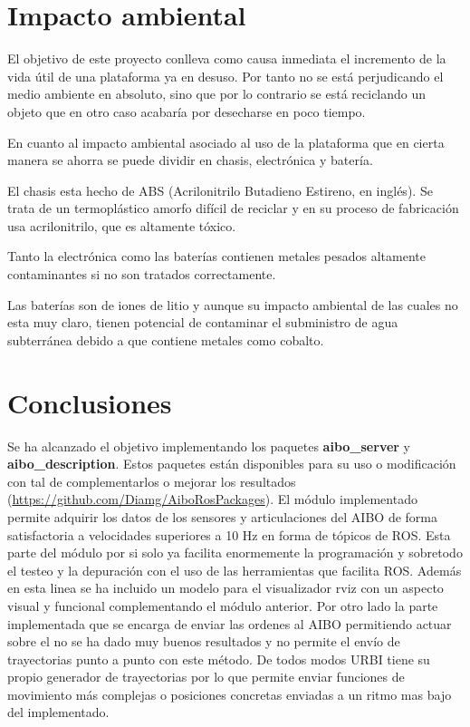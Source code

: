 \documentclass[12pt,a4paper,final,twoside]{book}
\begin{document}
\newpage

\chapter{Impacto ambiental}
\thispagestyle{fancy}
El objetivo de este proyecto conlleva como causa inmediata el incremento de la vida útil de una plataforma ya en desuso. Por tanto no se está perjudicando el medio ambiente en absoluto, sino que por lo contrario se está reciclando un objeto que en otro caso acabaría por desecharse en poco tiempo.

En cuanto al impacto ambiental asociado al uso de la plataforma que en cierta manera se ahorra se puede dividir en chasis, electrónica y batería.

El chasis esta hecho de ABS (Acrilonitrilo Butadieno Estireno, en inglés). Se trata de un termoplástico amorfo difícil de reciclar y en su proceso de fabricación usa acrilonitrilo, que es altamente tóxico.

Tanto la electrónica como las baterías contienen metales pesados altamente contaminantes si no son tratados correctamente.

Las baterías son de iones de litio y aunque su impacto ambiental de las cuales no esta muy claro, tienen potencial de contaminar el subministro de agua subterránea debido a que contiene metales como cobalto.


\newpage
\chapter*{Conclusiones}
\thispagestyle{fancy}
Se ha alcanzado el objetivo implementando los paquetes \textbf{aibo{\_}server} y \textbf{aibo{\_}description}. Estos paquetes están disponibles para su uso o modificación con tal de complementarlos o mejorar los resultados (\url{https://github.com/Diamg/AiboRosPackages}). 
El módulo implementado permite adquirir los datos de los sensores y articulaciones del AIBO de forma satisfactoria a velocidades superiores a 10 Hz en forma de tópicos de ROS. Esta parte del módulo por si solo ya facilita enormemente la programación y sobretodo el testeo y la depuración con el uso de las herramientas que facilita ROS. Además en esta linea se ha incluido un modelo para el visualizador rviz con un aspecto visual y funcional complementando el módulo anterior.  
Por otro lado la parte implementada que se encarga de enviar las ordenes al AIBO permitiendo actuar sobre el no se ha dado muy buenos resultados y no permite el envío de trayectorias punto a punto con este método. De todos modos URBI tiene su propio generador de trayectorias por lo que permite enviar funciones de movimiento más complejas  o posiciones concretas enviadas a un ritmo mas bajo del implementado.
\end{document}
